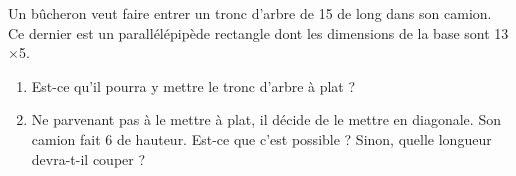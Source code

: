 
\begin{exercice}[\ldots/6]\label{exosmath-0597}

    Un bûcheron veut faire entrer un tronc d'arbre de \unit{15}{\meter} de long dans son camion. Ce dernier est un parallélépipède rectangle dont les dimensions de la base sont \unit{13}{\meter}$\times$\unit{5}{\meter}.

    \begin{enumerate}
        \item
            Est-ce qu'il pourra y mettre le tronc d'arbre à plat ?
        \item
            Ne parvenant pas à le mettre à plat, il décide de le mettre en diagonale. Son camion fait \unit{6}{\meter} de hauteur. Est-ce que c'est possible ? Sinon, quelle longueur devra-t-il couper ?
    \end{enumerate}

\end{exercice}
